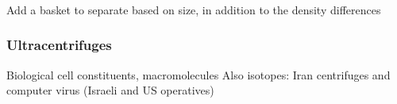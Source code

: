 \begin{frame}\frametitle{}
	Add a basket to separate based on size, in addition to the density differences
\end{frame}

\begin{frame}\frametitle{Ultracentrifuges}
	Biological cell constituents, macromolecules
	Also isotopes: Iran centrifuges and computer virus (Israeli and US operatives)
\end{frame}